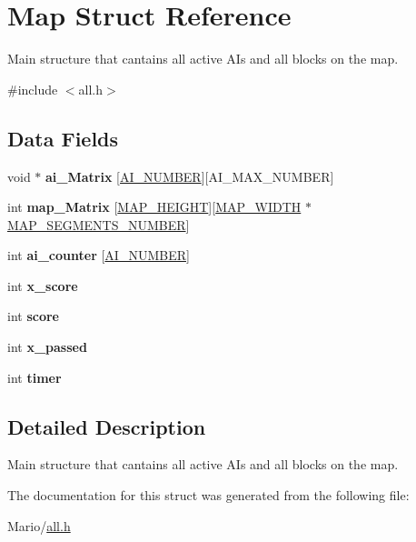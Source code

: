 \hypertarget{struct_map}{}\section{Map Struct Reference}
\label{struct_map}


Main structure that cantains all active AI\textquotesingle{}s and all blocks on the map.  




{\ttfamily \#include $<$all.\+h$>$}

\subsection*{Data Fields}
\begin{DoxyCompactItemize}
\item 
\mbox{\label{struct_map_af0e7c8226567f248fd29ed76680d0ff4}} 
void $\ast$ {\bfseries ai\+\_\+\+Matrix} \mbox{[}\mbox{\hyperlink{all_8h_abe566baff0b290dc637bbc5114e7ce7b}{A\+I\+\_\+\+N\+U\+M\+B\+ER}}\mbox{]}\mbox{[}A\+I\+\_\+\+M\+A\+X\+\_\+\+N\+U\+M\+B\+ER\mbox{]}
\item 
\mbox{\label{struct_map_a13ebd79484793d4df4dd867fe5c3c9c8}} 
int {\bfseries map\+\_\+\+Matrix} \mbox{[}\mbox{\hyperlink{all_8h_a529d5ebb449edf31d9835d13f4fb9f89}{M\+A\+P\+\_\+\+H\+E\+I\+G\+HT}}\mbox{]}\mbox{[}\mbox{\hyperlink{all_8h_aa037a6d6a4f04d51c7ec1c9ee9054e76}{M\+A\+P\+\_\+\+W\+I\+D\+TH}} $\ast$\mbox{\hyperlink{all_8h_a3e430d1e74998e120179513cb1f4b2bd}{M\+A\+P\+\_\+\+S\+E\+G\+M\+E\+N\+T\+S\+\_\+\+N\+U\+M\+B\+ER}}\mbox{]}
\item 
\mbox{\label{struct_map_a1917667d3a0f2fa4612189e80d6b573f}} 
int {\bfseries ai\+\_\+counter} \mbox{[}\mbox{\hyperlink{all_8h_abe566baff0b290dc637bbc5114e7ce7b}{A\+I\+\_\+\+N\+U\+M\+B\+ER}}\mbox{]}
\item 
\mbox{\label{struct_map_a2e79adfe967b7b9e1f6b0d2e36fc6511}} 
int {\bfseries x\+\_\+score}
\item 
\mbox{\label{struct_map_aef160b7437d94056f1dc59646cd5b87d}} 
int {\bfseries score}
\item 
\mbox{\label{struct_map_a9305c2310e0dde18e8ad378f40302857}} 
int {\bfseries x\+\_\+passed}
\item 
\mbox{\label{struct_map_ae2c6087027bfdf561a2b766975b47ee8}} 
int {\bfseries timer}
\end{DoxyCompactItemize}


\subsection{Detailed Description}
Main structure that cantains all active AI\textquotesingle{}s and all blocks on the map. 

The documentation for this struct was generated from the following file\+:\begin{DoxyCompactItemize}
\item 
Mario/\mbox{\hyperlink{all_8h}{all.\+h}}\end{DoxyCompactItemize}

